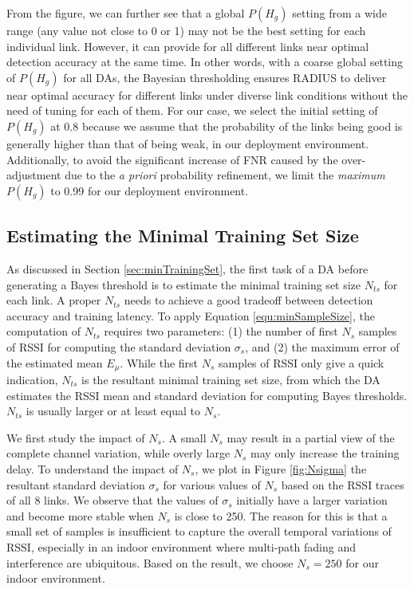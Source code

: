 From the figure, we can further see that a global $P(H_g)$ setting from a wide range (any value not close to 0 or 1) may not be the best setting for each individual link. However, it can provide for all different links near optimal detection accuracy at the same time. In other words, with a coarse global setting of $P(H_g)$ for all DAs, the Bayesian thresholding ensures RADIUS to deliver near optimal accuracy for different links under diverse link conditions without the need of tuning for each of them. For our case, we select the initial setting of $P(H_g)$ at 0.8 because we assume that the probability of the links being good is generally higher than that of being weak, in our deployment environment. Additionally, to avoid the significant increase of FNR caused by the over-adjustment due to the \textit{a priori} probability refinement, we limit the \textit{maximum} $P(H_g)$ to 0.99 for our deployment environment.




\subsection{Estimating the Minimal Training Set Size}\label{sec:evaParamTrainingSize}

As discussed in Section \ref{sec:minTrainingSet}, the first task of a DA before generating a Bayes threshold is to estimate the minimal training set size $N_{ts}$ for each link. A proper $N_{ts}$ needs to achieve a good tradeoff between detection accuracy and training latency. To apply Equation \ref{equ:minSampleSize}, the computation of $N_{ts}$ requires two parameters: (1) the number of first $N_s$ samples of RSSI for computing the standard deviation $\sigma_s$, and (2) the maximum error of the estimated mean  $E_{\mu}$. While the first $N_{s}$ samples of RSSI only give a quick indication, $N_{ts}$ is the resultant minimal training set size, from which the DA estimates the RSSI mean and standard deviation for computing Bayes thresholds. $N_{ts}$ is usually larger or at least equal to $N_{s}$.   

We first study the impact of $N_{s}$. A small $N_{s}$ may result in a partial view of the complete channel variation, while overly large $N_{s}$ may only increase the training delay. To understand the impact of $N_{s}$, we plot in Figure \ref{fig:Nsigma} the resultant standard deviation $\sigma_s$ for various values of $N_s$ based on the RSSI traces of all 8 links. We observe that the values of $\sigma_s$ initially have a larger variation and become more stable when $N_s$ is close to 250. The reason for this is that a small set of samples is insufficient to capture the overall temporal variations of RSSI, especially in an indoor environment where multi-path fading and interference are ubiquitous. Based on the result, we choose $N_s = 250$ for our indoor environment. %
  

